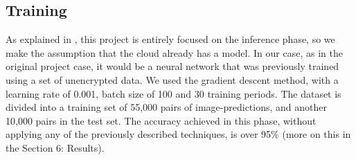 \subsection{Training}

As explained in \cite{dowlin2016cryptonets}, this project is entirely focused on the inference phase, so we make the assumption that the cloud already has a model. In our case, as in the original project case, it would be a neural network that was previously trained using a set of unencrypted data. We used the gradient descent method, with a learning rate of 0.001, batch size of 100 and 30 training periods. The dataset is divided into a training set of 55,000 pairs of image-predictions, and another 10,000 pairs in the test set. The accuracy achieved in this phase, without applying any of the previously described techniques, is over 95\% (more on this in the Section 6: Results).
